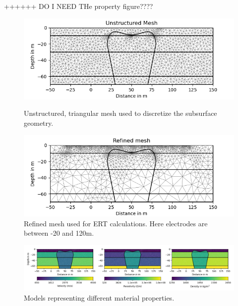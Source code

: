++++++ DO I NEED THe property figure????
\begin{figure}[H]
  \centering
  \begin{minipage}[b]{0.48\textwidth}
    \includegraphics[width=\textwidth]{Figures/Mesh.png}
    \caption[Unstructured mesh]{Unstructured, triangular mesh used to discretize the subsurface geometry.}
    \label{figure:mesh}
  \end{minipage}
  \hfill
  \begin{minipage}[b]{0.48\textwidth}
    \includegraphics[width=\textwidth]{Figures/ERT_refined_mesh.png}
    \caption[Refined mesh used for ERT calculations]{Refined mesh used for ERT calculations. Here electrodes are between -20 and 120m.}
    \label{figure:refined_mesh}
  \end{minipage}
\end{figure}

\begin{figure}[H]
\noindent\includegraphics[width=\textwidth]{Figures/models_with_parameters.png}
\caption[Models representing different material properties]{Models representing different material properties.}
\label{figure:model_with_para}
\end{figure}


